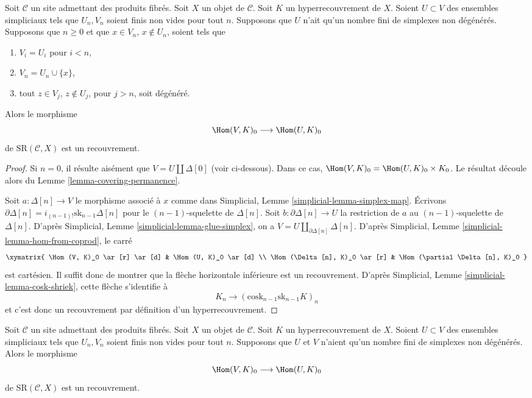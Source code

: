\begin{lemma}
\label{lemma-one-more-simplex}
Soit $\mathcal{C}$ un site admettant des produits fibrés.
Soit $X$ un objet de $\mathcal{C}$.
Soit $K$ un hyperrecouvrement de $X$.
Soient $U \subset V$ des ensembles simpliciaux tels que $U_n, V_n$
soient finis non vides pour tout $n$.
Supposons que $U$ n'ait qu'un nombre fini de simplexes non dégénérés.
Supposons que $n \geq 0$ et que $x \in V_n$,
$x \not \in U_n$, soient tels que
\begin{enumerate}
\item $V_i = U_i$ pour $i < n$,
\item $V_n = U_n \cup \{x\}$,
\item tout $z \in V_j$, $z \not \in U_j$, pour $j > n$,
soit dégénéré.
\end{enumerate}
Alors le morphisme
$$
\Hom(V, K)_0
\longrightarrow
\Hom(U, K)_0
$$
de $\text{SR}(\mathcal{C}, X)$ est un recouvrement.
\end{lemma}

\begin{proof}
Si $n = 0$, il résulte aisément que $V = U \amalg \Delta[0]$
(voir ci-dessous). Dans ce cas, $\Hom(V, K)_0 =
\Hom(U, K)_0 \times K_0$. Le résultat découle alors
du Lemme \ref{lemma-covering-permanence}.

\medskip\noindent
Soit $a : \Delta[n] \to V$ le morphisme associé à $x$
comme dans Simplicial, Lemme \ref{simplicial-lemma-simplex-map}.
Écrivons $\partial \Delta[n] = i_{(n-1)!} \text{sk}_{n - 1} \Delta[n]$
pour le $(n - 1)$-squelette de $\Delta[n]$.
Soit $b : \partial \Delta[n] \to U$ la restriction
de $a$ au $(n - 1)$-squelette de $\Delta[n]$. D'après
Simplicial, Lemme \ref{simplicial-lemma-glue-simplex},
on a $V = U \amalg_{\partial \Delta[n]} \Delta[n]$. D'après
Simplicial, Lemme
\ref{simplicial-lemma-hom-from-coprod},
le carré
$$
\xymatrix{
\Hom(V, K)_0 \ar[r] \ar[d] &
\Hom(U, K)_0 \ar[d] \\
\Hom(\Delta[n], K)_0 \ar[r] &
\Hom(\partial \Delta[n], K)_0
}
$$
est cartésien. Il suffit donc de montrer que
la flèche horizontale inférieure est un recouvrement. D'après
Simplicial, Lemme \ref{simplicial-lemma-cosk-shriek},
cette flèche s'identifie à
$$
K_n \to (\text{cosk}_{n - 1} \text{sk}_{n - 1} K)_n
$$
et c'est donc un recouvrement par définition d'un hyperrecouvrement.
\end{proof}

\begin{lemma}
\label{lemma-add-simplices}
Soit $\mathcal{C}$ un site admettant des produits fibrés.
Soit $X$ un objet de $\mathcal{C}$.
Soit $K$ un hyperrecouvrement de $X$.
Soient $U \subset V$ des ensembles simpliciaux tels que $U_n, V_n$
soient finis non vides pour tout $n$.
Supposons que $U$ et $V$ n'aient qu'un nombre fini de simplexes non dégénérés.
Alors le morphisme
$$
\Hom(V, K)_0
\longrightarrow
\Hom(U, K)_0
$$
de $\text{SR}(\mathcal{C}, X)$ est un recouvrement.
\end{lemma}

